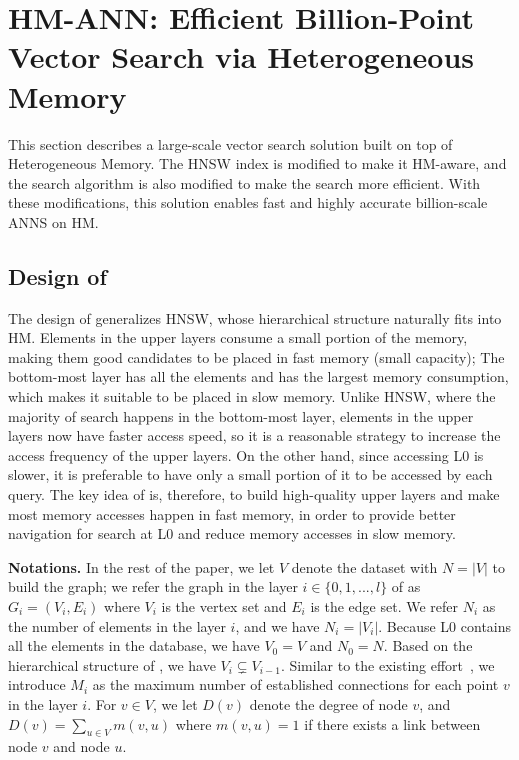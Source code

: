 \section{HM-ANN: Efficient Billion-Point Vector Search via Heterogeneous Memory}
\label{minjia_sec:hmann}

This section describes a large-scale vector search solution built on top of Heterogeneous Memory. The HNSW index is modified to make it HM-aware, and the search algorithm is also modified to make the search more efficient. With these modifications, this solution enables fast and highly accurate billion-scale ANNS on HM.

\subsection{Design of \name}

The design of \algoname generalizes HNSW, whose hierarchical structure naturally fits into HM. Elements in the upper layers consume a small portion of the memory, making them good candidates to be placed in fast memory (small capacity); The bottom-most layer has all the elements and has the largest memory consumption, which makes it suitable to be placed in slow memory. Unlike HNSW, where the majority of search happens in the bottom-most layer, elements in the upper layers now have faster access speed, so it is a reasonable strategy to increase the access frequency of the upper layers. On the other hand, since accessing L0 is slower, it is preferable to have only a small portion of it to be accessed by each query. The key idea of \algoname is, therefore, to build high-quality upper layers and make most memory accesses happen in fast memory, in order to provide better navigation for search at L0 and reduce memory accesses in slow memory.

\textbf{Notations.} In the rest of the paper, we let $V$ denote the dataset with $N=|V|$ to build the graph; we refer the graph in the layer $i \in \{0, 1,...,l\}$ of \name as $G_i = (V_i, E_i)$ where $V_i$ is the vertex set and $E_i$ is the edge set. We refer $N_i$ as the number of elements in the layer $i$, and we have $N_i=|V_i|$. Because L0 contains all the elements in the database, we have $V_0 = V$ and $N_0 = N$. Based on the hierarchical structure of \name, we have $ V_i \subsetneq V_{i-1}$.  Similar to the existing effort~\cite{hnsw}, we introduce $M_i$ as the maximum number of established connections for each point $v$ in the layer $i$. For $v \in V$, we let $D(v) $ denote the degree of node $v$, and $D(v) = \sum_{u \in V} m(v,u)$ where $m(v,u)=1$ if there exists a link between node $v$ and node $u$.

